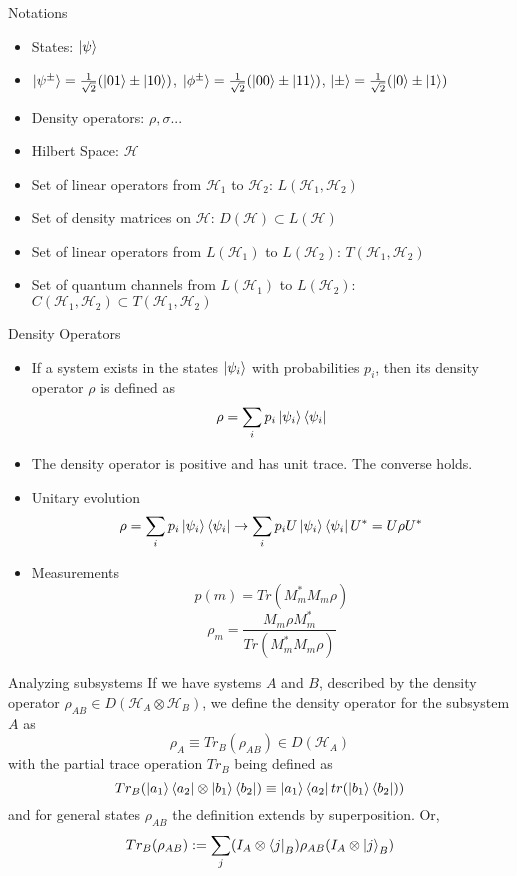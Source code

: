 \documentclass[handout]{beamer}
\newcommand{\Hilb}{\mathcal{H}}
\begin{document}
\begin{frame}{Notations}
    \begin{itemize}
        \item States: $\ket{\psi}$
        \item $\ket{\psi^{\pm}} = \frac{1}{\sqrt{2}}(\ket{01}\pm\ket{10})$, $\ket{\phi^{\pm}} = \frac{1}{\sqrt{2}}(\ket{00}\pm\ket{11})$, $\ket{\pm} = \frac{1}{\sqrt{2}}(\ket{0}\pm\ket{1})$
        \item Density operators: $\rho,\sigma...$
        \item Hilbert Space: $\Hilb$
        \item Set of linear operators from $\Hilb_1$ to $\Hilb_2$: $L(\Hilb_1,\Hilb_2)$
        \item Set of density matrices on $\Hilb$: $D(\Hilb) \subset L(\Hilb)$
        \item Set of linear operators from $L(\Hilb_1)$ to $L(\Hilb_2)$: $T(\Hilb_1,\Hilb_2)$
        \item Set of quantum channels from $L(\Hilb_1)$ to $L(\Hilb_2)$: $C(\Hilb_1,\Hilb_2) \subset T(\Hilb_1,\Hilb_2)$
    \end{itemize}
\end{frame}

\begin{frame}{Density Operators}
\begin{itemize}
\item If a system exists in the states $\ket{\psi_i}$ with probabilities $p_i$, \pause then its density operator $\rho$ is defined as\pause
\[\rho = \sum_ip_i\ket{\psi_i}\bra{\psi_i}\]\pause
\item The density operator is positive and has unit trace. \pause The converse holds.
\item Unitary evolution\pause
\[\rho = \sum_ip_i\ket{\psi_i}\bra{\psi_i} \to \sum_ip_iU\ket{\psi_i}\bra{\psi_i}U^* = U\rho U^*\]\pause
\item Measurements \pause
\[p(m) = Tr(M_m^*M_m\rho)\]\pause
\[\rho_m = \frac{M_m\rho M_m^*}{Tr(M_m^*M_m\rho)}\]\pause
\end{itemize}
\end{frame}

\begin{frame}{Analyzing subsystems}
If we have systems $A$ and $B$, described by the density operator $\rho_{AB}\in D(\Hilb_A\otimes \Hilb_B)$, we define the density operator for the subsystem $A$ as\pause
\[\rho_A \equiv Tr_B(\rho_{AB}) \in D(\Hilb_A)\]\pause
with the partial trace operation $Tr_B$ being defined as\pause
\[Tr_B(\ket{a_1}\bra{a_2}\otimes \ket{b_1}\bra{b_2}) \equiv \ket{a_1}\bra{a_2}tr(\ket{b_1}\bra{b_2}) )\]\pause
and for general states $\rho_{AB}$ the definition extends by superposition. \pause Or,
\[Tr_B(\rho_{AB}) := \sum_j(I_A\otimes \bra{j}_B)\rho_{AB}(I_A\otimes \ket{j}_B)\]
\end{frame}
\end{document}
